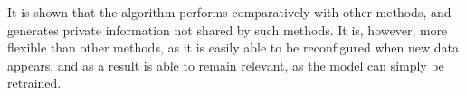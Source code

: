 It is shown that the algorithm performs comparatively with other methods, and generates private information not shared by such methods. It is, however, more flexible than other methods, as it is easily able to be reconfigured when new data appears, and as a result is able to remain relevant, as the model can simply be retrained.





%
%
%
